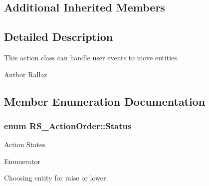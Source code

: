 \subsection*{Additional Inherited Members}


\subsection{Detailed Description}
This action class can handle user events to move entities.

\begin{DoxyAuthor}{Author}
Rallaz 
\end{DoxyAuthor}


\subsection{Member Enumeration Documentation}
\hypertarget{classRS__ActionOrder_a73c1b6d1065fb42673b4b1494a406a2a}{
\subsubsection[{Status}]{\setlength{\rightskip}{0pt plus 5cm}enum {\bf R\-S\-\_\-\-Action\-Order\-::\-Status}}}\label{classRS__ActionOrder_a73c1b6d1065fb42673b4b1494a406a2a}
Action States. \begin{Desc}
\item[Enumerator]\par
\begin{description}
\item[{\em 
\hypertarget{classRS__ActionOrder_a73c1b6d1065fb42673b4b1494a406a2aa8dee5ef432cbbf2d27129927d4c22fee}{Choose\-Entity}\label{classRS__ActionOrder_a73c1b6d1065fb42673b4b1494a406a2aa8dee5ef432cbbf2d27129927d4c22fee}
}]Choosing entity for raise or lower. \end{description}
\end{Desc}


